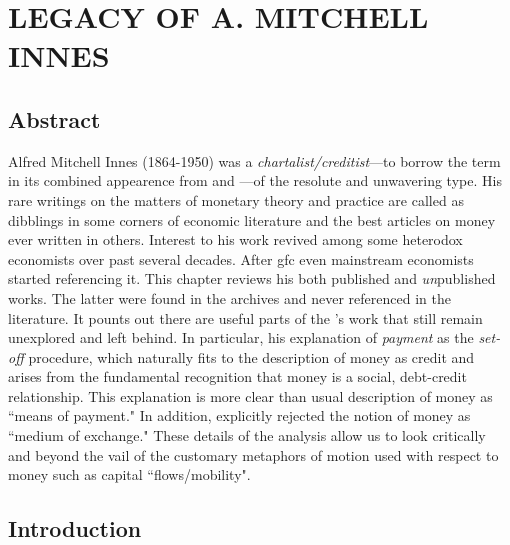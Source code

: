 \newpage {}
\newpage {}
\newpage {}
\newpage {}

\section{\MakeUppercase{Legacy of A. Mitchell Innes}}\label{sec:innes}

\subsection*{Abstract}

Alfred Mitchell Innes (1864-1950) was a \textit{chartalist/creditist}---to borrow the term in its combined appearence from \cite{goodhart2005} and \cite{earley1994}---of the resolute and unwavering type. His rare writings on the matters of monetary theory and practice are called as dibblings in some corners of economic literature and the best articles on money ever written in others. Interest to his work revived among some heterodox economists over past several decades. After \ac{gfc} even mainstream economists started referencing it. This chapter reviews his both published and \textit{un}published works. The latter were found in the archives and never referenced in the literature. It pounts out there are useful parts of the \citeauthor{innes1913}'s work that still remain unexplored and left behind. In particular, his explanation of \textit{payment} as the \textit{set-off} procedure, which naturally fits to the description of money as credit and arises from the fundamental recognition that money is a social, debt-credit relationship. This explanation is more clear than usual description of money as ``means of payment." In addition, \citeauthor{innes1913} explicitly rejected the notion of money as ``medium of exchange." These details of the analysis allow us to look critically and beyond the vail of the customary metaphors of motion used with respect to money such as capital ``flows/mobility".

\subsection{Introduction}

